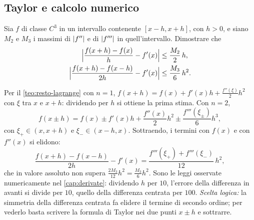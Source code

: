 \subsection*{Taylor e calcolo numerico}

\begin{esercizio}\label{es:errore-differenze}
Sia $f$ di classe $C^{3}$ in un intervallo contenente $[x-h,x+h]$, con $h>0$, e siano
$M_{2}$ e $M_{3}$ i massimi di $\lvert f''\rvert$ e di $\lvert f'''\rvert$ in quell'intervallo. Dimostrare che
\[
\begin{aligned}
  \Bigl|\frac{f(x+h)-f(x)}h-f'(x)\Bigr|&\le\frac{M_{2}}2\,h ,\\
  \Bigl|\frac{f(x+h)-f(x-h)}{2h}-f'(x)\Bigr|&\le\frac{M_{3}}6\,h^{2} .
\end{aligned}
\]
\begin{soluzione}
Per il \cref{teo:resto-lagrange} con $n=1$, $f(x+h)=f(x)+f'(x)h+\frac{f''(\xi)}2h^{2}$ con $\xi$
tra $x$ e $x+h$: dividendo per $h$ si ottiene la prima stima. Con $n=2$,
\[
  f(x\pm h)=f(x)\pm f'(x)h+\frac{f''(x)}2h^{2}\pm\frac{f'''(\xi_{\pm})}6h^{3} ,
\]
con $\xi_{+}\in(x,x+h)$ e $\xi_{-}\in(x-h,x)$. Sottraendo, i termini con $f(x)$ e con $f''(x)$ si
elidono:
\[
  \frac{f(x+h)-f(x-h)}{2h}-f'(x)=\frac{f'''(\xi_{+})+f'''(\xi_{-})}{12}\,h^{2} ,
\]
che in valore assoluto non supera $\frac{2M_{3}}{12}h^{2}=\frac{M_{3}}6h^{2}$. Sono le leggi osservate
numericamente nel \cref{cap:derivate}: dividendo $h$ per $10$, l'errore della differenza in
avanti si divide per $10$, quello della differenza centrata per $100$. \emph{Scelta
logica:} la simmetria della differenza centrata fa elidere il termine di secondo ordine;
per vederlo basta scrivere la formula di Taylor nei due punti $x\pm h$ e sottrarre.
\end{soluzione}
\end{esercizio}

